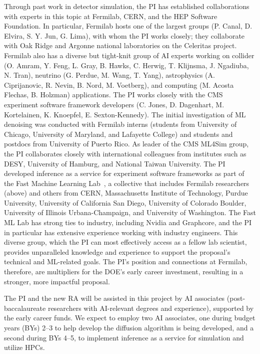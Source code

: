 Through past work in detector simulation, the PI has established collaborations with experts in this topic at Fermilab, CERN, and the HEP Software Foundation.
In particular, Fermilab hosts one of the largest \GEANTfour groups (P. Canal, D. Elvira, S. Y. Jun, G. Lima), with whom the PI works closely;
they collaborate with Oak Ridge and Argonne national laboratories on the Celeritas project.
Fermilab also has a diverse but tight-knit group of AI experts working on collider (O. Amram, Y. Feng, L. Gray, B. Hawks, C. Herwig, T. Klijnsma, J. Ngadiuba, N. Tran),
neutrino (G. Perdue, M. Wang, T. Yang), astrophysics (A. Ciprijanovic, R. Nevin, B. Nord, M. Voetberg), and computing (M. Acosta Flechas, B. Holzman) applications.
The PI works closely with the CMS experiment software framework developers (C. Jones, D. Dagenhart, M. Kortelainen, K. Knoepfel, E. Sexton-Kennedy).
The initial investigation of ML denoising was conducted with Fermilab interns (students from University of Chicago, University of Maryland, and Lafayette College) and students and postdocs from University of Puerto Rico.
As leader of the CMS ML4Sim group, the PI collaborates closely with international colleagues from institutes such as DESY, University of Hamburg, and National Taiwan University.
The PI developed inference as a service for experiment software frameworks as part of the Fast Machine Learning Lab~\cite{FML},
a collective that includes Fermilab researchers (above)
and others from CERN, Massachusetts Institute of Technology, Purdue University, University of California San Diego, University of Colorado Boulder, University of Illinois Urbana-Champaign, and University of Washington.
The Fast ML Lab has strong ties to industry, including Nvidia and Graphcore, and the PI in particular has extensive experience working with industry engineers.
This diverse group, which the PI can most effectively access as a fellow lab scientist,
provides unparalleled knowledge and experience to support the proposal's technical and ML-related goals.
The PI's position and connections at Fermilab, therefore, are multipliers for the DOE's early career investment, resulting in a stronger, more impactful proposal.

The PI and the new RA will be assisted in this project by AI associates (post-baccalaureate researchers with AI-relevant degrees and experience), supported by the early career funds.
We expect to employ two AI associates, one during budget years (BYs) 2--3 to help develop the diffusion algorithm is being developed, and a second during BYs 4--5, to implement inference as a service for simulation and utilize HPCs.